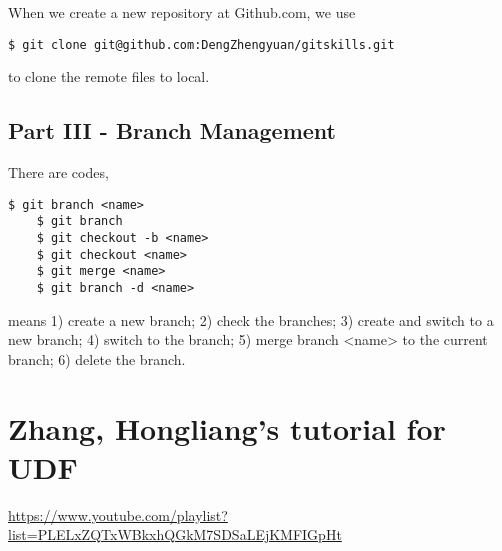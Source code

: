 \documentclass[11pt]{article}
\begin{document}
When we create a new repository at Github.com, we use
\begin{lstlisting}[basicstyle=\small\conso]
    $ git clone git@github.com:DengZhengyuan/gitskills.git
\end{lstlisting}
to clone the remote files to local.

\subsection{Part III - Branch Management}
There are codes,
\begin{lstlisting}[basicstyle=\small\conso]
    $ git branch <name>
    $ git branch
    $ git checkout -b <name> 
    $ git checkout <name> 
    $ git merge <name> 
    $ git branch -d <name>
\end{lstlisting}
means 1) create a new branch; 2) check the branches; 3) create and switch to a new branch; 4) switch to the branch; 5) merge branch <name> to the current branch; 6) delete the branch. 


\section{Zhang, Hongliang's tutorial for UDF}
\url{https://www.youtube.com/playlist?list=PLELxZQTxWBkxhQGkM7SDSaLEjKMFIGpHt}
\end{document}
